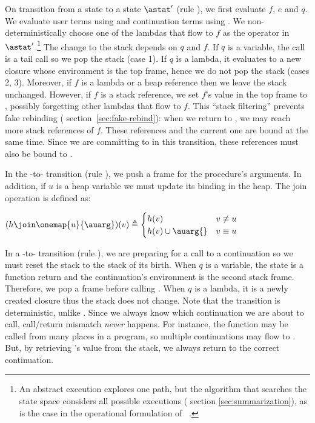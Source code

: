 \documentclass{LMCS}
\theoremstyle{definition} \newtheorem{property}[thm]{Property}
\begin{document}
On transition from a \daueval{} state \astat{} to a \dauapply{} state $\astat'$
(rule ), we first evaluate $f$, $e$ and $q$.
We evaluate user terms using \ubigaNA{} and continuation terms using \kbigaNA.
We non-deterministically choose one of the lambdas that flow to $f$ as the
operator in $\astat'$.\footnote{An abstract execution explores one path, but the
algorithm that searches the state space considers all possible executions
(\confer{} section \ref{sec:summarization}), as is the case in the operational
formulation of \kcfa~\cite{diss/07/might/dcfa}.}
The change to the stack depends on $q$ and $f$.
If $q$ is a variable, the call is a tail call so we pop the stack (case 1).
If $q$ is a lambda, it evaluates to a new closure whose environment is the top 
frame, hence we do not pop the stack (cases 2, 3).
Moreover, if $f$ is a lambda or a heap reference then we leave the
stack unchanged.
However, if $f$ is a stack reference, we set $f$'s value in the top 
frame to \mset{\mulam}, possibly forgetting other lambdas that flow to $f$.
This ``stack filtering'' prevents fake 
rebinding ({\confer} section~\ref{sec:fake-rebind}):
when we return to \acarg{}, we may reach more stack references of $f$.
These references and the current one are bound at the same time.
Since we are committing to \mulam{} in this transition, 
these references must also be bound to \mulam.

In the \dauapply-to-\daeval{} transition (rule ), we push a frame for
the procedure's arguments.
In addition, if $u$ is a heap variable we must update its binding in the heap.
The join operation \join{} is defined as:
\begin{center}
  $(h \join \onemap{u}{\auarg})(v) \triangleq
  \begin{cases}
    h(v) & v \not\equiv u \\
    h(v) \cup \auarg{} & v \equiv u
  \end{cases}$
\end{center}

In a \daceval-to-\dacapply{} transition (rule ), we are preparing for
a call to a continuation so we must reset the stack to the stack of its birth. 
When $q$ is a variable, the \daceval{} state is a function return and the
continuation's environment is the second stack frame.
Therefore, we pop a frame before calling \mclam.
When $q$ is a lambda, 
it is a newly created closure thus the stack does not change.
Note that the transition is deterministic, unlike .
Since we always know which continuation we are about to call, call/return
mismatch \emph{never} happens.
For instance, the function  may be called from many places in a program,
so multiple continuations may flow to .
But, by retrieving 's value from the stack, we always return to the 
correct continuation.
\end{document}

